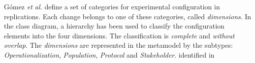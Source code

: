 
Gómez \emph{et al.} \cite{gomez2014understanding} define a set of categories for experimental configuration in replications. Each change belongs to one of these categories, called \emph{dimensions}.
In the class diagram, a hierarchy has been used to classify the configuration elements into the four dimensions. The classification is  \emph{complete} and \emph{without overlap}. The \emph{dimensions} are represented in the metamodel by the subtypes: \textit{Operationalization}, \textit{Population}, \textit{Protocol} and \textit{Stakeholder}.
\textcolor[rgb]{1,0,0}{identified in  \cite{gomez2014understanding,santos2018analyzing}}



